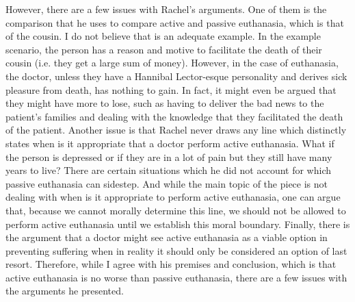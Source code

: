\documentclass{article}
\begin{document}
However, there are a few issues with Rachel's arguments. One of them is the comparison
that he uses to compare active and passive euthanasia, which is that of the cousin.
I do not believe that is an adequate example. In the example scenario, the person
has a reason and motive to facilitate the death of their cousin (i.e. they get a large
sum of money). However, in the case of euthanasia, the doctor, unless they have a
Hannibal Lector-esque personality and derives sick pleasure from death, has nothing
to gain. In fact, it might even be argued that they might have more to lose, such
as having to deliver the bad news to the patient's families and dealing with the knowledge
that they facilitated the death of the patient. Another issue is that Rachel never draws
any line which distinctly states when is it appropriate that a doctor perform
active euthanasia. What if the person is depressed or if they are in a lot of pain
but they still have many years to live? There are certain situations which he did not
account for which passive euthanasia can sidestep. And while the main topic of the
piece is not dealing with when is it appropriate to perform active euthanasia, one
can argue that, because we cannot morally determine this line, we should not be
allowed to perform active euthanasia until we establish this moral boundary. Finally,
there is the argument that a doctor might see active euthanasia as a viable option in
preventing suffering when in reality it should only be considered an option of
last resort. Therefore, while I agree with his premises and conclusion, which is
that active euthanasia is no worse than passive euthanasia, there are a few issues
with the arguments he presented.
\end{document}
